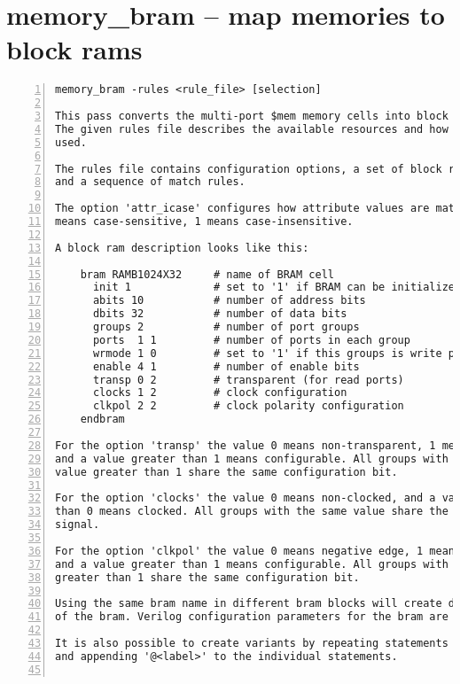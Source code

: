 \section{memory\_bram -- map memories to block rams}
\label{cmd:memory_bram}
\begin{lstlisting}[numbers=left,frame=single]
    memory_bram -rules <rule_file> [selection]

This pass converts the multi-port $mem memory cells into block ram instances.
The given rules file describes the available resources and how they should be
used.

The rules file contains configuration options, a set of block ram description
and a sequence of match rules.

The option 'attr_icase' configures how attribute values are matched. The value 0
means case-sensitive, 1 means case-insensitive.

A block ram description looks like this:

    bram RAMB1024X32     # name of BRAM cell
      init 1             # set to '1' if BRAM can be initialized
      abits 10           # number of address bits
      dbits 32           # number of data bits
      groups 2           # number of port groups
      ports  1 1         # number of ports in each group
      wrmode 1 0         # set to '1' if this groups is write ports
      enable 4 1         # number of enable bits
      transp 0 2         # transparent (for read ports)
      clocks 1 2         # clock configuration
      clkpol 2 2         # clock polarity configuration
    endbram

For the option 'transp' the value 0 means non-transparent, 1 means transparent
and a value greater than 1 means configurable. All groups with the same
value greater than 1 share the same configuration bit.

For the option 'clocks' the value 0 means non-clocked, and a value greater
than 0 means clocked. All groups with the same value share the same clock
signal.

For the option 'clkpol' the value 0 means negative edge, 1 means positive edge
and a value greater than 1 means configurable. All groups with the same value
greater than 1 share the same configuration bit.

Using the same bram name in different bram blocks will create different variants
of the bram. Verilog configuration parameters for the bram are created as needed.

It is also possible to create variants by repeating statements in the bram block
and appending '@<label>' to the individual statements.


\end{lstlisting}
